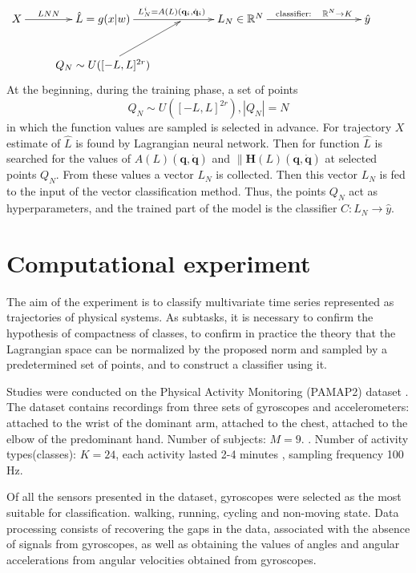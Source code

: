 \documentclass[sn-mathphys-num]{sn-jnl}
\theoremstyle{thmstylethree}
\theoremstyle{thmstyletwo}
\theoremstyle{thmstyleone}
\begin{document}
\begin{equation}
\xymatrix{
X  \ar@{->}[r]^-{LNN}  & \hat{L}=g(x|w) \ar@{->}[rr]^{{L_N^{i} = A(L)\left(\mathbf{q}_i, \dot{\mathbf{q}}_i\right)}} & {} & L_N \in \mathbb{R}^N \ar@{->}[rrr]^-{\text{classifier}:\quad \mathbb{R}^N \to K} &  &  & \hat{y} \\
 & Q_N \sim U([-L, L]^{2r}) \ar@{->}[ur]  &  &  &  &  &  &
}
\label{fig: classificator}
\end{equation}
At the beginning, during the training phase, a set of points 
\[
Q_N \sim U([-L, L]^{2r}), |Q_N| = N
\] 
in which the function values are sampled is selected in advance. For trajectory $X$ estimate of $\hat{L}$ is found by Lagrangian neural network. Then for
function $\hat{L}$ is searched for the values of $A(L)\left(\mathbf{q}, \dot{\mathbf{q}}\right)$ and $\|\mathbf{H}(L)\left(\mathbf{q}, \dot{\mathbf{q}}\right)$ at selected points $Q_N$. From these values a vector $L_N$ is collected. Then this vector $L_N$ is fed to the input of the vector classification method. Thus, the points  $Q_N$ act as hyperparameters, and the trained part of the model is the classifier $C: L_N \to \hat{y}$.

\section{Computational experiment}
The aim of the experiment is to classify multivariate time series represented as trajectories
of physical systems. As subtasks, it is necessary to confirm the hypothesis of compactness of
classes, to confirm in practice the theory that the Lagrangian space can be normalized by the
proposed norm and sampled by a predetermined set of points, and to construct a classifier using
it.

Studies were conducted on the Physical Activity Monitoring (PAMAP2) dataset \cite{misc_pamap2_physical_activity_monitoring_231}.
The
dataset contains recordings from three sets of gyroscopes and accelerometers: attached to the
wrist of the dominant arm, attached to the chest, attached to the elbow of the predominant hand. Number of subjects: $M = 9$. . Number of activity types(classes): $K = 24$, each activity lasted 2-4 minutes \cite{misc_pamap2_physical_activity_monitoring_231}, sampling frequency 100 Hz.


Of all the sensors presented in the dataset, gyroscopes were selected as the most suitable for classification. walking, running, cycling and non-moving state. Data processing consists of recovering the gaps in the data, associated with the absence of signals from gyroscopes, as well as obtaining the values of
angles and angular accelerations from angular velocities obtained from gyroscopes.
\end{document}

